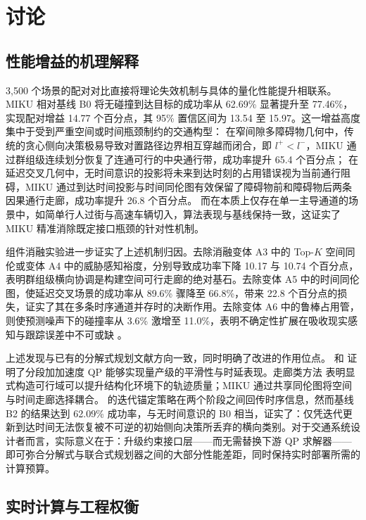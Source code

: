 \section{讨论}
\label{zh:sec:discussion}

\subsection{性能增益的机理解释}

3,500 个场景的配对对比直接将理论失效机制与具体的量化性能提升相联系。MIKU 相对基线 B0 将无碰撞到达目标的成功率从 62.69\% 显著提升至 77.46\%，实现配对增益 14.77 个百分点，其 95\% 置信区间为 13.54 至 15.97。这一增益高度集中于受到严重空间或时间瓶颈制约的交通构型：
在窄间隙多障碍物几何中，传统的贪心侧向决策极易导致对置路径边界相互穿越而闭合，即 $l^+ < l^-$，MIKU 通过群组级连续划分恢复了连通可行的中央通行带，成功率提升 65.4 个百分点；
在延迟交叉几何中，无时间意识的投影将未来到达时刻的占用错误视为当前通行阻碍，MIKU 通过到达时间投影与时间同伦图有效保留了障碍物前和障碍物后两条因果通行走廊，成功率提升 26.8 个百分点。
而在本质上仅存在单一主导通道的场景中，如简单行人过街与高速车辆切入，算法表现与基线保持一致，这证实了 MIKU 精准消除既定接口瓶颈的针对性机制。

组件消融实验进一步证实了上述机制归因。去除消融变体 A3 中的 Top-$K$ 空间同伦或变体 A4 中的威胁感知裕度，分别导致成功率下降 10.17 与 10.74 个百分点，表明群组级横向协调是构建空间可行走廊的绝对基石。去除变体 A5 中的时间同伦图，使延迟交叉场景的成功率从 89.6\% 骤降至 66.8\%，带来 22.8 个百分点的损失，证实了其在多条时序通道并存时的决断作用。去除变体 A6 中的鲁棒占用管，则使预测噪声下的碰撞率从 3.6\% 激增至 11.0\%，表明不确定性扩展在吸收现实感知与跟踪误差中不可或缺 \citep{yoon2024stcorridor,yangbo2023ped,pathspeedstructured2024}。

上述发现与已有的分解式规划文献方向一致，同时明确了改进的作用位点。\citet{fan2018baidu} 和 \citet{zhang2020pathqp} 证明了分段加加速度 QP 能够实现量产级的平滑性与时延表现。走廊类方法 \citep{liu2017sfc,yoon2024stcorridor} 表明显式构造可行域可以提升结构化环境下的轨迹质量；MIKU 通过共享同伦图将空间与时间走廊选择耦合。\citet{chen2019em} 的迭代锚定策略在两个阶段之间回传时序信息，然而基线 B2 的结果达到 62.09\% 成功率，与无时间意识的 B0 相当，证实了：仅凭迭代更新到达时间无法恢复被不可逆的初始侧向决策所丢弃的横向类别。对于交通系统设计者而言，实际意义在于：升级约束接口层——而无需替换下游 QP 求解器——即可弥合分解式与联合式规划器之间的大部分性能差距，同时保持实时部署所需的计算预算。

\subsection{实时计算与工程权衡}

